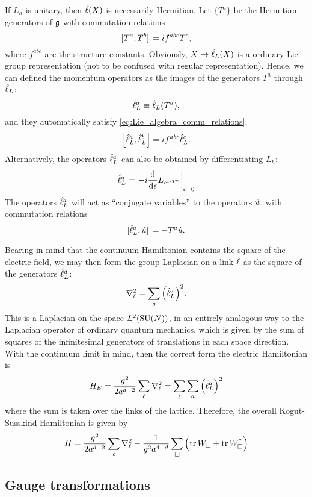 If $L_h$ is unitary, then $\hat{\ell}(X)$ is necessarily Hermitian.
Let $\{T^a\}$ be the Hermitian generators of $\mathfrak{g}$ with commutation relations
\begin{equation}
    \comm*{T^a}{T^b} = i f^{abc} T^c,
    \label{eq:Lie_algebra_comm_relations}
\end{equation}
where $f^{abc}$ are the structure constants.
Obviously, $X \mapsto \hat{\ell}_L(X)$ is a ordinary Lie group representation (not to be confused with regular representation).
Hence, we can defined the momentum operators as the images of the generators $T^a$ through $\hat{\ell}_L$:
\begin{equation}
    \hat{\ell}^a_L \equiv \hat{\ell}_L(T^a),
\end{equation}
and they automatically satisfy \eqref{eq:Lie_algebra_comm_relations},
\begin{equation}
    \comm{\generator^a_L}{\generator^b_L} = i f^{abc} \generator^c_L.
\end{equation}
Alternatively, the operators $\hat{\ell}^a_L$ can also be obtained by differentiating $L_h$:
\begin{equation}
    \generator^a_L = \eval{-i \dv{\epsilon} L_{e^{i \epsilon T^a}}}_{\epsilon=0}
\end{equation}
The operators $\hat{\ell}^a_L$ will act as ``conjugate variables'' to the operators $\hat{u}$, with commutation relations
\begin{equation}
    \comm*{\generator_L^a}{\transport} = -T^a \transport.
\end{equation}

Bearing in mind that the continuum Hamiltonian contains the square of the electric field, we may then form the group Laplacian on a link $\ell$ as the square of the generators $\hat{\ell}^a_L$:
\begin{equation}
    \laplacian_{\link} = \sum_{a} \qty( \generator^a_L )^2.
\end{equation}
This is a Laplacian on the space $L^2(\text{SU}(N))$, in an entirely analogous way to the Laplacian operator of ordinary quantum mechanics, which is given by the sum of squares of the infinitesimal generators of translations in each space direction.
With the continuum limit in mind, then the correct form the electric Hamiltonian is
\begin{equation}
    H_E =
    \frac{g^2}{2 a^{d-2}} \sum_{\link} \laplacian_{\link} =
    \sum_{\link} \sum_{a} \qty( \generator_L^a )^2
\end{equation}
where the sum is taken over the links of the lattice.
Therefore, the overall Kogut-Susskind Hamiltonian is given by
\begin{equation}
    H =
    \frac{g^2}{2 a^{d-2}} \sum_{\link} \laplacian_{\link}
    - \frac{1}{g^2 a^{4-d}} \sum_{\square} \qty(
        \tr\WilsonPlaq + \tr \WilsonPlaq^{\dagger}
    )
\end{equation}


\subsection{Gauge transformations}
\label{sub:gauge_transformations}


